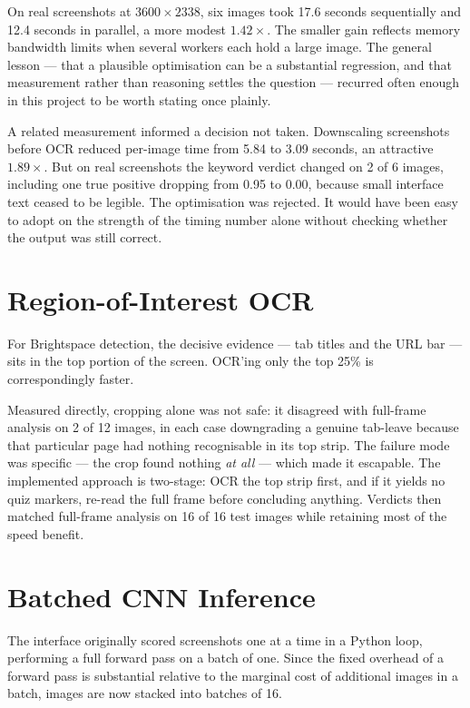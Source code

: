 \documentclass[12pt,oneside]{report}
\begin{document}
On real screenshots at $3600\times2338$, six images took 17.6 seconds
sequentially and 12.4 seconds in parallel, a more modest $1.42\times$. The
smaller gain reflects memory bandwidth limits when several workers each hold a
large image. The general lesson --- that a plausible optimisation can be a
substantial regression, and that measurement rather than reasoning settles the
question --- recurred often enough in this project to be worth stating once
plainly.

A related measurement informed a decision not taken. Downscaling screenshots
before OCR reduced per-image time from 5.84 to 3.09 seconds, an attractive
$1.89\times$. But on real screenshots the keyword verdict changed on 2 of 6
images, including one true positive dropping from 0.95 to 0.00, because small
interface text ceased to be legible. The optimisation was rejected. It would
have been easy to adopt on the strength of the timing number alone without
checking whether the output was still correct.

\section{Region-of-Interest OCR}
\label{sec:roi}

For Brightspace detection, the decisive evidence --- tab titles and the URL bar
--- sits in the top portion of the screen. OCR'ing only the top 25\% is
correspondingly faster.

Measured directly, cropping alone was not safe: it disagreed with full-frame
analysis on 2 of 12 images, in each case downgrading a genuine tab-leave
because that particular page had nothing recognisable in its top strip. The
failure mode was specific --- the crop found nothing \emph{at all} --- which
made it escapable. The implemented approach is two-stage: OCR the top strip
first, and if it yields no quiz markers, re-read the full frame before
concluding anything. Verdicts then matched full-frame analysis on 16 of 16
test images while retaining most of the speed benefit.

\section{Batched CNN Inference}
\label{sec:batching}

The interface originally scored screenshots one at a time in a Python loop,
performing a full forward pass on a batch of one. Since the fixed overhead of a
forward pass is substantial relative to the marginal cost of additional images
in a batch, images are now stacked into batches of 16.
\end{document}

